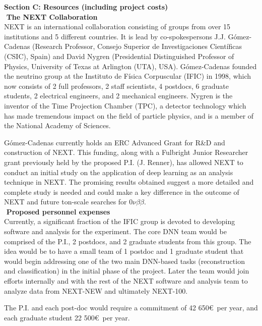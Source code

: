 \documentclass[11pt,a4paper]{article}
\begin{document}
{\noindent\textbf{Section C: Resources (including project costs)}}\\

\noindent\textbf{\textbullet\,\,The NEXT Collaboration}\\
NEXT is an international collaboration consisting of groups from over 15 institutions and 5 different countries. It is lead by co-spokespersons J.J. G\'{o}mez-Cadenas (Research Professor, Consejo Superior de Investigaciones Cient\'{i}ficas (CSIC), Spain) and David Nygren (Presidential Distinguished Professor of Physics, University of Texas at Arlington (UTA), USA). G\'{o}mez-Cadenas founded the neutrino group at the Instituto de F\'{i}sica Corpuscular (IFIC) in 1998, which now consists of 2 full professors, 2 staff scientists, 4 postdocs, 6 graduate students, 2 electrical engineers, and 2 mechanical engineers. Nygren is the inventor of the Time Projection Chamber (TPC), a detector technology which has made tremendous impact on the field of particle physics, and is a member of the National Academy of Sciences.

G\'{o}mez-Cadenas currently holds an ERC Advanced Grant for R\&D and construction of NEXT. This funding, along with a Fulbright Junior Researcher grant previously held by the proposed P.I. (J. Renner), has allowed NEXT to conduct an initial study on the application of deep learning as an analysis technique in NEXT. The promising results obtained suggest a more detailed and complete study is needed and could make a key difference in the outcome of NEXT and future ton-scale searches for $0\nu\beta\beta$.\\

\noindent\textbf{\textbullet\,\,Proposed personnel expenses}\\
Currently, a significant fraction of the IFIC group is devoted to developing software and analysis for the experiment. The core DNN team would be comprised of the P.I., 2 postdocs, and 2 graduate students from this group. The idea would be to have a small team of 1 postdoc and 1 graduate student that would begin addressing one of the two main DNN-based tasks (reconstruction and classification) in the initial phase of the project. Later the team would join efforts internally and with the rest of the NEXT software and analysis team to analyze data from NEXT-NEW and ultimately NEXT-100.

The P.I. and each post-doc would require a commitment of 42 650\euro ~per year, and each graduate student 22 500\euro ~per year.\\
\end{document}
